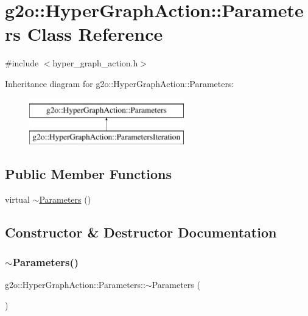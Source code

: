 \hypertarget{classg2o_1_1_hyper_graph_action_1_1_parameters}{}\section{g2o\+:\+:Hyper\+Graph\+Action\+:\+:Parameters Class Reference}
\label{classg2o_1_1_hyper_graph_action_1_1_parameters}


{\ttfamily \#include $<$hyper\+\_\+graph\+\_\+action.\+h$>$}

Inheritance diagram for g2o\+:\+:Hyper\+Graph\+Action\+:\+:Parameters\+:\begin{figure}[H]
\begin{center}
\leavevmode
\includegraphics[height=2.000000cm]{classg2o_1_1_hyper_graph_action_1_1_parameters}
\end{center}
\end{figure}
\subsection*{Public Member Functions}
\begin{DoxyCompactItemize}
\item 
virtual \mbox{\hyperlink{classg2o_1_1_hyper_graph_action_1_1_parameters_aecdc1052f4d31297a94d32fade46b2d7}{$\sim$\+Parameters}} ()
\end{DoxyCompactItemize}


\subsection{Constructor \& Destructor Documentation}
\mbox{\label{classg2o_1_1_hyper_graph_action_1_1_parameters_aecdc1052f4d31297a94d32fade46b2d7}} 
\subsubsection{\texorpdfstring{$\sim$\+Parameters()}{~Parameters()}}
{\footnotesize\ttfamily g2o\+::\+Hyper\+Graph\+Action\+::\+Parameters\+::$\sim$\+Parameters (\begin{DoxyParamCaption}{ }\end{DoxyParamCaption})\hspace{0.3cm}{\ttfamily [virtual]}}



